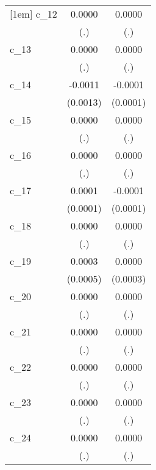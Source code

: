 {\begin{tabular}{l*{2}{c}}
[1em]
c\_12        &      0.0000        &      0.0000        \\
            &         (.)        &         (.)        \\
[1em]
c\_13        &      0.0000        &      0.0000        \\
            &         (.)        &         (.)        \\
[1em]
c\_14        &     -0.0011        &     -0.0001        \\
            &    (0.0013)        &    (0.0001)        \\
[1em]
c\_15        &      0.0000        &      0.0000        \\
            &         (.)        &         (.)        \\
[1em]
c\_16        &      0.0000        &      0.0000        \\
            &         (.)        &         (.)        \\
[1em]
c\_17        &      0.0001        &     -0.0001        \\
            &    (0.0001)        &    (0.0001)        \\
[1em]
c\_18        &      0.0000        &      0.0000        \\
            &         (.)        &         (.)        \\
[1em]
c\_19        &      0.0003        &      0.0000        \\
            &    (0.0005)        &    (0.0003)        \\
[1em]
c\_20        &      0.0000        &      0.0000        \\
            &         (.)        &         (.)        \\
[1em]
c\_21        &      0.0000        &      0.0000        \\
            &         (.)        &         (.)        \\
[1em]
c\_22        &      0.0000        &      0.0000        \\
            &         (.)        &         (.)        \\
[1em]
c\_23        &      0.0000        &      0.0000        \\
            &         (.)        &         (.)        \\
[1em]
c\_24        &      0.0000        &      0.0000        \\
            &         (.)        &         (.)        \\

\end{tabular}}
